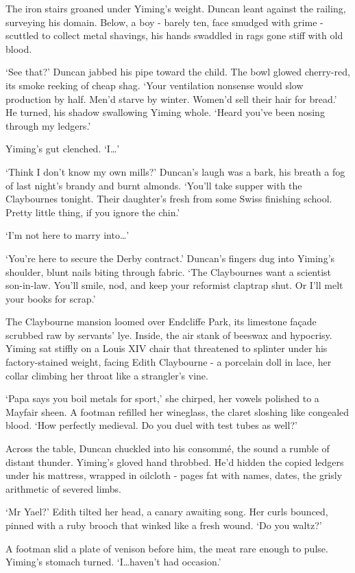 The iron stairs groaned under Yiming's weight. Duncan leant against the railing, surveying his domain. Below, a boy - barely ten, face smudged with grime - scuttled to collect metal shavings, his hands swaddled in rags gone stiff with old blood.

`See that?' Duncan jabbed his pipe toward the child. The bowl glowed cherry-red, its smoke reeking of cheap shag. `Your ventilation nonsense would slow production by half. Men'd starve by winter. Women'd sell their hair for bread.' He turned, his shadow swallowing Yiming whole. `Heard you've been nosing through my ledgers.'

Yiming's gut clenched. `I\dots'

`Think I don't know my own mills?' Duncan's laugh was a bark, his breath a fog of last night's brandy and burnt almonds. `You'll take supper with the Claybournes tonight. Their daughter's fresh from some Swiss finishing school. Pretty little thing, if you ignore the chin.'

`I'm not here to marry into\dots'

`You're here to secure the Derby contract.' Duncan's fingers dug into Yiming's shoulder, blunt nails biting through fabric. `The Claybournes want a scientist son-in-law. You'll smile, nod, and keep your reformist claptrap shut. Or I'll melt your books for scrap.'

The Claybourne mansion loomed over Endcliffe Park, its limestone façade scrubbed raw by servants' lye. Inside, the air stank of beeswax and hypocrisy. Yiming sat stiffly on a Louis XIV chair that threatened to splinter under his factory-stained weight, facing Edith Claybourne - a porcelain doll in lace, her collar climbing her throat like a strangler's vine.

`Papa says you boil metals for sport,' she chirped, her vowels polished to a Mayfair sheen. A footman refilled her wineglass, the claret sloshing like congealed blood. `How perfectly medieval. Do you duel with test tubes as well?'

Across the table, Duncan chuckled into his consommé, the sound a rumble of distant thunder. Yiming's gloved hand throbbed. He'd hidden the copied ledgers under his mattress, wrapped in oilcloth - pages fat with names, dates, the grisly arithmetic of severed limbs.

`Mr Yael?' Edith tilted her head, a canary awaiting song. Her curls bounced, pinned with a ruby brooch that winked like a fresh wound. `Do you waltz?'

A footman slid a plate of venison before him, the meat rare enough to pulse. Yiming's stomach turned. `I\dots haven't had occasion.'

